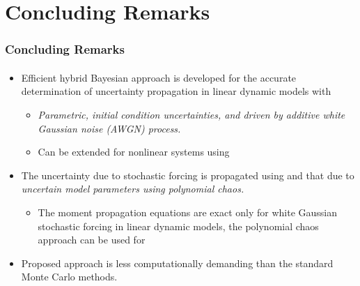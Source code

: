 \documentclass{beamer}
\begin{document}
\section{Concluding Remarks}

\begin{frame}\frametitle{Concluding Remarks}\framesubtitle{\color{white}{What needs to be done}}
\transboxin

\begin{itemize}
\item<1->  Efficient hybrid Bayesian approach is developed for the accurate determination of uncertainty propagation in linear dynamic models with
\begin{itemize}
\item<1-> \alert{\textit{Parametric, initial condition uncertainties, and driven by additive white Gaussian noise (AWGN) process.}}
\item<1-> Can be extended for nonlinear systems using {}
\end{itemize}
\item<2-> The uncertainty due to stochastic forcing is propagated using {\color{blue}{mean and covariance propagation equations}} and that due to \textit{uncertain model parameters using polynomial chaos.}
\begin{itemize}
\item<2-> The moment propagation equations are \alert{exact only for white Gaussian stochastic forcing} in linear dynamic models, the polynomial chaos approach can be used for {\color{blue}{any probability distribution of model parameters.}}
\end{itemize}
\item<3->  Proposed approach is \alert{less computationally demanding} than the standard Monte Carlo methods.
\end{itemize}
\end{frame}
\end{document}
